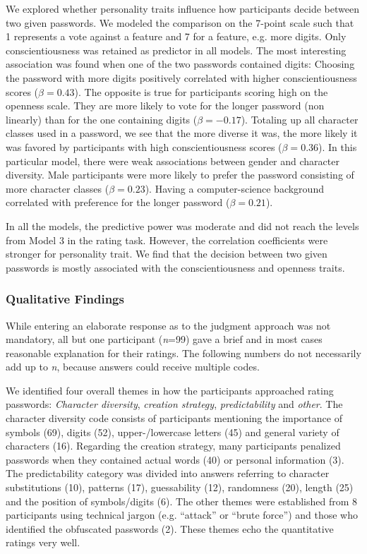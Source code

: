 We explored whether personality traits influence how participants decide between two given passwords. We modeled the comparison on the 7-point scale such that 1 represents a vote against a feature and 7 for a feature, e.g. more digits. Only conscientiousness was retained as predictor in all models. The most interesting association was found when one of the two passwords contained digits: Choosing the password with more digits positively correlated with higher conscientiousness scores ($\beta = 0.43$). The opposite is true for participants scoring high on the openness scale. They are more likely to vote for the longer password (non linearly) than for the one containing digits ($\beta = -0.17$). Totaling up all character classes used in a password, we see that the more diverse it was, the more likely it was favored by participants with high conscientiousness scores ($\beta = 0.36$). 
In this particular model, there were weak associations between gender and character diversity. Male participants were more likely to prefer the password consisting of more character classes ($\beta = 0.23$). Having a computer-science background correlated with preference for the longer password ($\beta = 0.21$).

In all the models, the predictive power was moderate and did not reach the levels from Model 3 in the rating task. However, the correlation coefficients were stronger for personality trait. We find that the decision between two given passwords is mostly associated with the conscientiousness and openness traits.



%

\subsubsection{Qualitative Findings}
While entering an elaborate response as to the judgment approach was not mandatory, all but one participant (\textit{n}=99) gave a brief and in most cases reasonable explanation for their ratings. The following numbers do not necessarily add up to \textit{n}, because answers could receive multiple codes.

We identified four overall themes in how the participants approached rating passwords: \textit{Character diversity}, \textit{creation strategy}, \textit{predictability} and \textit{other}. The character diversity code consists of participants mentioning the importance of symbols (69), digits (52), upper-/lowercase letters (45) and general variety of characters (16). Regarding the creation strategy, many participants penalized passwords when they contained actual words (40) or personal information (3). The predictability category was divided into answers referring to character substitutions (10), patterns (17), guessability (12), randomness (20), length (25) and the position of symbols/digits (6). The other themes were established from 8 participants using technical jargon (e.g. ``attack'' or ``brute force'') and those who identified the obfuscated passwords (2). These themes echo the quantitative ratings very well. 

